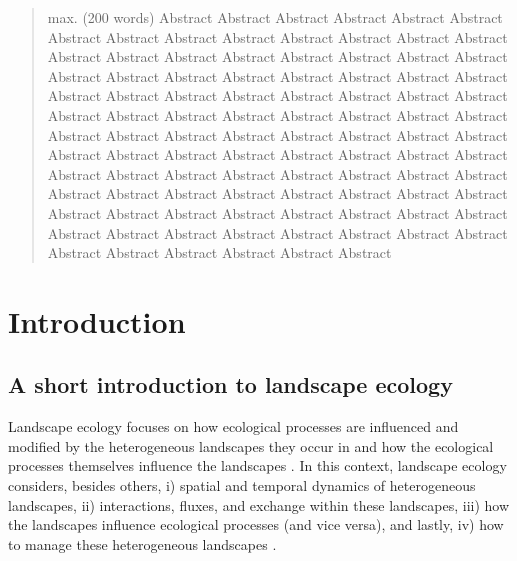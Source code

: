 \documentclass[smallextended]{svjour3}       %
\begin{document}
\begin{abstract}
max. (200 words) Abstract Abstract Abstract Abstract Abstract Abstract Abstract Abstract Abstract Abstract Abstract Abstract Abstract Abstract Abstract Abstract Abstract Abstract Abstract Abstract Abstract Abstract Abstract Abstract Abstract Abstract Abstract Abstract Abstract Abstract Abstract Abstract Abstract Abstract Abstract Abstract Abstract Abstract Abstract Abstract Abstract Abstract Abstract Abstract Abstract Abstract Abstract Abstract Abstract Abstract Abstract Abstract Abstract Abstract Abstract Abstract Abstract Abstract Abstract Abstract Abstract Abstract Abstract Abstract Abstract Abstract Abstract Abstract Abstract Abstract Abstract Abstract Abstract Abstract Abstract Abstract Abstract Abstract Abstract Abstract Abstract Abstract Abstract Abstract Abstract Abstract Abstract Abstract Abstract Abstract Abstract Abstract Abstract Abstract Abstract Abstract Abstract Abstract Abstract Abstract
\\


\end{abstract}


\def\spacingset#1{\renewcommand{\baselinestretch}%
{#1}\small\normalsize} \spacingset{1}


\linenumbers

\hypertarget{sec:intro}{%
\section{Introduction}\label{sec:intro}}

\hypertarget{sec:landscape_ecology}{%
\subsection{A short introduction to landscape ecology}\label{sec:landscape_ecology}}

Landscape ecology focuses on how ecological processes are influenced and modified by the heterogeneous landscapes they occur in and how the ecological processes themselves influence the landscapes \cite{Turner1989,Turner2005,With2019}.
In this context, landscape ecology considers, besides others, i) spatial and temporal dynamics of heterogeneous landscapes, ii) interactions, fluxes, and exchange within these landscapes, iii) how the landscapes influence ecological processes (and vice versa), and lastly, iv) how to manage these heterogeneous landscapes \cite{Risser1984,Turner1989}.
\end{document}
